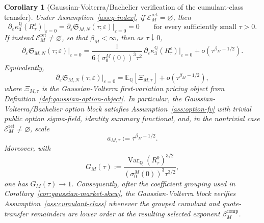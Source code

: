\documentclass[11pt,a4paper]{amsart}
\theoremstyle{plain}
\newtheorem{corollary}[theorem]{Corollary}
\theoremstyle{definition}
\theoremstyle{remark}
\DeclareMathOperator{\Var}{Var}
\newcommand{\QQ}{\mathbb{Q}}
\newcommand{\EE}{\mathbb{E}}
\newcommand{\cE}{\mathcal{E}}
\begin{document}
\begin{corollary}[Gaussian-Volterra/Bachelier verification of the cumulant-class transfer]\label{cor:bachelier-transfer}
Under Assumption~\ref{ass:q-index}, if \(\cE_M^{\mathrm{ret}}=\varnothing\),
then
\[
        \partial_\varepsilon
        \kappa_3^\QQ(R_\tau^\varepsilon)\big|_{\varepsilon=0}
        =
        \partial_\varepsilon
        \mathfrak S_{M,N}(\tau;\varepsilon)\big|_{\varepsilon=0}
        =
        0
        \qquad
        \text{for every sufficiently small }\tau>0.
\]
If instead \(\cE_M^{\mathrm{ret}}\neq\varnothing\), so that \(\beta_M<\infty\), then as
\(\tau\downarrow0\),
\[
        \partial_\varepsilon
        \mathfrak S_{M,N}(\tau;\varepsilon)\big|_{\varepsilon=0}
        =
        \frac{1}{6(\sigma_0^M(0))^3\tau^2}\,
        \partial_\varepsilon \kappa_3^\QQ(R_\tau^\varepsilon)\big|_{\varepsilon=0}
        +
        o\!\left(\tau^{\beta_M-1/2}\right).
\]
Equivalently,
\[
        \partial_\varepsilon
        \mathfrak S_{M,N}(\tau;\varepsilon)\big|_{\varepsilon=0}
        =
        \EE_\QQ[\Xi_{M,\tau}]
        +
        o\!\left(\tau^{\beta_M-1/2}\right),
\]
where \(\Xi_{M,\tau}\) is the Gaussian-Volterra first-variation pricing object from
Definition~\ref{def:gaussian-option-object}.  In particular, the Gaussian-Volterra/Bachelier
option block satisfies Assumption~\ref{ass:option-fv} with trivial public option sigma-field,
identity summary functional, and, in the nontrivial case \(\cE_M^{\mathrm{ret}}\neq\varnothing\),
scale
\[
        a_{M,\tau}:=\tau^{\beta_M-1/2}.
\]
Moreover, with
\[
        G_M(\tau)
        :=
        \frac{\Var_\QQ(R_\tau^0)^{3/2}}{(\sigma_0^M(0))^3\tau^{3/2}},
\]
one has \(G_M(\tau)\to1\).  Consequently, after the coefficient grouping used in
Corollary~\ref{cor:gaussian-market-skew}, the Gaussian-Volterra block verifies
Assumption~\ref{ass:cumulant-class} whenever the grouped cumulant and quote-transfer remainders are
lower order at the resulting selected exponent \(\beta_M^{\mathrm{comp}}\).
\end{corollary}
\end{document}
